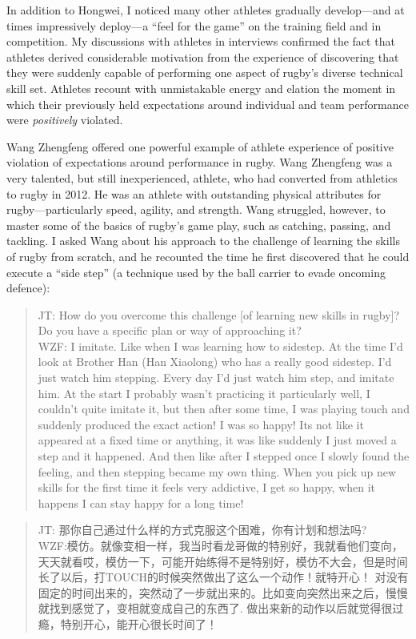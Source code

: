 \begin{CJK}{UTF8}{gbsn}
In addition to Hongwei, I noticed many other athletes gradually develop---and at times impressively deploy---a ``feel for the game'' on the training field and in competition.  My discussions with athletes in interviews confirmed the fact that athletes derived considerable motivation from the experience of discovering that they were suddenly capable of performing one aspect of rugby's diverse technical skill set.  Athletes recount with unmistakable energy and elation the moment in which their previously held expectations around individual and team performance were \textit{positively} violated.

Wang Zhengfeng offered one powerful example of athlete experience of positive violation of expectations around performance in rugby.  Wang Zhengfeng was a very talented, but still inexperienced, athlete, who had converted from athletics to rugby in 2012.  He was an athlete with outstanding physical attributes for rugby---particularly speed, agility, and strength.  Wang struggled, however, to master some of the basics of rugby's game play, such as catching, passing, and tackling. I asked Wang about his approach to the challenge of learning the skills of rugby from scratch, and he recounted the time he first discovered that he could execute a ``side step'' (a technique used by the ball carrier to evade oncoming defence):

    \begin{quote}
      JT: How do you overcome this challenge [of learning new skills in rugby]? Do you have a specific plan or way of approaching it? \\
      WZF: I imitate.  Like when I was learning how to sidestep. At the time I’d look at Brother Han (Han Xiaolong) who has a really good sidestep. I'd just watch him stepping.  Every day I'd just watch him step, and imitate him.  At the start I probably wasn't practicing it particularly well, I couldn't quite imitate it, but then after some time, I was playing touch and suddenly produced the exact action! I was so happy! Its not like it appeared at a fixed time or anything, it was like suddenly I just moved a step and it happened. And then like after I stepped once I slowly found the feeling, and then stepping became my own thing.  When you pick up new skills for the first time it feels very addictive, I get so happy, when it happens I can stay happy for a long time!
    \end{quote}

    \begin{quote}
      JT: 那你自己通过什么样的方式克服这个困难，你有计划和想法吗? \\
      WZF:模仿。就像变相一样，我当时看龙哥做的特别好，我就看他们变向，天天就看哎，模仿一下，可能开始练得不是特别好，模仿不大会，但是时间长了以后，打TOUCH的时候突然做出了这么一个动作！就特开心！ 对没有固定的时间出来的，突然动了一步就出来的。比如变向突然出来之后，慢慢就找到感觉了，变相就变成自己的东西了. 做出来新的动作以后就觉得很过瘾，特别开心，能开心很长时间了！
    \end{quote}


\end{CJK}
